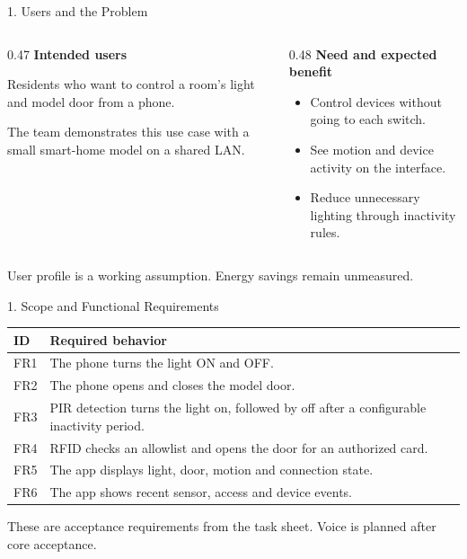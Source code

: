 \documentclass[aspectratio=169,11pt]{beamer}
\begin{document}
\begin{frame}{1. Users and the Problem}
  \begin{columns}[T,onlytextwidth]
    \begin{column}{0.47\textwidth}
      {\large\bfseries\color{DeepBlue} Intended users}\par
      Residents who want to control a room's light and model door from a phone.

      The team demonstrates this use case with a small smart-home model on a shared LAN.
    \end{column}
    \begin{column}{0.48\textwidth}
      {\large\bfseries\color{DeepBlue} Need and expected benefit}\par
      \begin{itemize}
        \item Control devices without going to each switch.
        \item See motion and device activity on the interface.
        \item Reduce unnecessary lighting through inactivity rules.
      \end{itemize}
    \end{column}
  \end{columns}
  \vspace{0.35cm}
  {\small User profile is a working assumption. Energy savings remain unmeasured.}
\end{frame}

\begin{frame}{1. Scope and Functional Requirements}
  \small
  \begin{tabularx}{\textwidth}{@{}lX@{}}
    \toprule
    \textbf{ID} & \textbf{Required behavior} \\
    \midrule
    FR1 & The phone turns the light ON and OFF. \\
    FR2 & The phone opens and closes the model door. \\
    FR3 & PIR detection turns the light on, followed by off after a configurable inactivity period. \\
    FR4 & RFID checks an allowlist and opens the door for an authorized card. \\
    FR5 & The app displays light, door, motion and connection state. \\
    FR6 & The app shows recent sensor, access and device events. \\
    \bottomrule
  \end{tabularx}
  \vspace{0.35cm}
  {\small These are acceptance requirements from the task sheet. Voice is planned after core acceptance.}
\end{frame}
\end{document}

